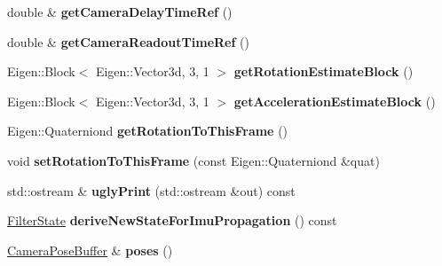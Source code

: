 \begin{DoxyCompactItemize}
\item 
\hypertarget{class_filter_state_a6563a73bad1016317018c85d53380962}{double \& {\bfseries get\-Camera\-Delay\-Time\-Ref} ()}\label{class_filter_state_a6563a73bad1016317018c85d53380962}

\item 
\hypertarget{class_filter_state_ab9d3e7cad1ae09ed35bcc528c0e8ef45}{double \& {\bfseries get\-Camera\-Readout\-Time\-Ref} ()}\label{class_filter_state_ab9d3e7cad1ae09ed35bcc528c0e8ef45}

\item 
\hypertarget{class_filter_state_a928bd10a77b39859d6f108f8dd8ae0e9}{Eigen\-::\-Block$<$ Eigen\-::\-Vector3d, 3, 1 $>$ {\bfseries get\-Rotation\-Estimate\-Block} ()}\label{class_filter_state_a928bd10a77b39859d6f108f8dd8ae0e9}

\item 
\hypertarget{class_filter_state_a4436166f7dbaf6c002b6fc2832b4f136}{Eigen\-::\-Block$<$ Eigen\-::\-Vector3d, 3, 1 $>$ {\bfseries get\-Acceleration\-Estimate\-Block} ()}\label{class_filter_state_a4436166f7dbaf6c002b6fc2832b4f136}

\item 
\hypertarget{class_filter_state_ab3d02580cdbd89bc64276467d7c1c854}{Eigen\-::\-Quaterniond {\bfseries get\-Rotation\-To\-This\-Frame} ()}\label{class_filter_state_ab3d02580cdbd89bc64276467d7c1c854}

\item 
\hypertarget{class_filter_state_ae820e97a5a74c7765780bc7bb223796b}{void {\bfseries set\-Rotation\-To\-This\-Frame} (const Eigen\-::\-Quaterniond \&quat)}\label{class_filter_state_ae820e97a5a74c7765780bc7bb223796b}

\item 
\hypertarget{class_filter_state_aed4aab3a5133d37924bc5c1284b6cb66}{std\-::ostream \& {\bfseries ugly\-Print} (std\-::ostream \&out) const }\label{class_filter_state_aed4aab3a5133d37924bc5c1284b6cb66}

\item 
\hypertarget{class_filter_state_af33cfbc67284846e3ca9c26a79c227a9}{\hyperlink{class_filter_state}{Filter\-State} {\bfseries derive\-New\-State\-For\-Imu\-Propagation} () const }\label{class_filter_state_af33cfbc67284846e3ca9c26a79c227a9}

\item 
\hypertarget{class_filter_state_acde2164859104e0c291f4eec0e1bcb07}{\hyperlink{class_camera_pose_buffer}{Camera\-Pose\-Buffer} \& {\bfseries poses} ()}\label{class_filter_state_acde2164859104e0c291f4eec0e1bcb07}

\end{DoxyCompactItemize}


